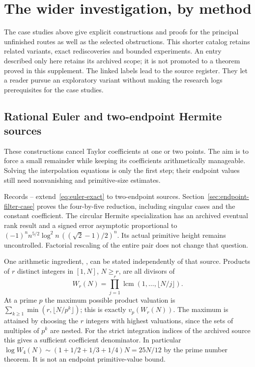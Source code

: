\section{The wider investigation, by method}\label{sec:atlas}
The case studies above give explicit constructions and proofs for the
principal unfinished routes as well as the selected obstructions.
This shorter catalog retains related variants, exact rediscoveries and
bounded experiments. An entry described only here retains its archived
scope; it is not promoted to a theorem proved in this supplement.
The linked labels lead to the source register. They let a reader pursue
an exploratory variant without making the research logs prerequisites
for the case studies.

\subsection{Rational Euler and two-endpoint Hermite sources}
These constructions cancel Taylor coefficients at one or two points.
The aim is to force a small remainder while keeping its coefficients
arithmetically manageable. Solving the interpolation equations is only
the first step; their endpoint values still need nonvanishing and
primitive-size estimates.

Records -- extend~\eqref{eq:euler-exact} to two-endpoint sources.
Section~\ref{sec:endpoint-filter-case} proves the four-by-five reduction,
including singular cases and the constant coefficient. The circular
Hermite specialization has an archived eventual rank result and a signed
error asymptotic proportional to
$(-1)^n n^{5/2}\log^2 n\,((\sqrt2-1)/2)^n$.
Its actual primitive height remains uncontrolled. Factorial rescaling
of the entire pair does not change that question.

One arithmetic ingredient, , can be stated independently of that
source. Products of $r$ distinct integers in $[1,N]$, $N\geq r$,
are all divisors of
\[
 W_r(N)=\prod_{j=1}^r\operatorname{lcm}(1,\ldots,\lfloor N/j\rfloor).
\]
At a prime $p$ the maximum possible product valuation is
$\sum_{k\geq1}\min(r,\lfloor N/p^k\rfloor)$; this is exactly
$v_p(W_r(N))$. The maximum is attained by choosing the $r$ integers
with highest valuations, since the sets of multiples of $p^k$ are nested.
For the strict integration indices of the archived source this gives
a sufficient coefficient denominator. In particular
$\log W_4(N)\sim(1+1/2+1/3+1/4)N=25N/12$ by the prime number
theorem. It is not an endpoint primitive-value bound.

